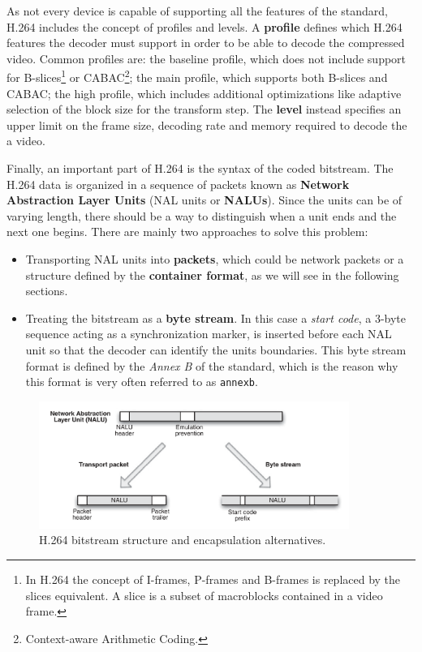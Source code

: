 As not every device is capable of supporting all the features of the standard, H.264 includes the concept of profiles and levels. A \textbf{profile} defines which H.264 features the decoder must support in order to be able to decode the compressed video. Common profiles are: the baseline profile, which does not include support for B-slices\footnote{In H.264 the concept of I-frames, P-frames and B-frames is replaced by the slices equivalent. A slice is a subset of macroblocks contained in a video frame.} or CABAC\footnote{Context-aware Arithmetic Coding.}; the main profile, which supports both B-slices and CABAC; the high profile, which includes additional optimizations like adaptive selection of the block size for the transform step. The \textbf{level} instead specifies an upper limit on the frame size, decoding rate and memory required to decode the a video.

Finally, an important part of H.264 is the syntax of the coded bitstream. The H.264 data is organized in a sequence of packets known as \textbf{Network Abstraction Layer Units} (NAL units or \textbf{NALUs}). Since the units can be of varying length, there should be a way to distinguish when a unit ends and the next one begins. There are mainly two approaches to solve this problem:

\begin{itemize}
    \item Transporting NAL units into \textbf{packets}, which could be network packets or a structure defined by the \textbf{container format}, as we will see in the following sections.
    \item Treating the bitstream as a \textbf{byte stream}. In this case a \textit{start code}, a 3-byte sequence acting as a synchronization marker, is inserted before each NAL unit so that the decoder can identify the units boundaries. This byte stream format is defined by the \textit{Annex B} of the standard, which is the reason why this format is very often referred to as \texttt{annexb}.
\end{itemize}

\begin{figure}
	\centering
	
	\includegraphics[width=0.9\textwidth]{res/h264_nalu.png}
	
	\caption{H.264 bitstream structure and encapsulation alternatives.}
	\label{fig:h264_scope}
\end{figure}

